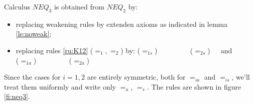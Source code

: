 \begin{DEFINITION} Calculus $NEQ_3$ is obtained from $NEQ_2$ by:
\begin{itemize}\MyLPar
\item replacing weakening rules by extenden axioms as indicated in lemma \ref{le:noweak};
\item replacing rules \ref{ru:K12} ($=_1, =_2$) by:
 ($=_{1s}$)
\label{ru:K12s} \ \ \ \ \ \ \ \ 
 ($=_{2s}$)\ \ \
and \\
\PROOFRULE{s=t,\Gamma_t^x,\Seq\Delta}{s=t,\Gamma_s^x,\Seq\Delta} ($=_{1a}$)
\label{ru:K12a} \ \ \ \ \ \ \ \ 
 ($=_{2a}$)\ \ \
%
\end{itemize}
\end{DEFINITION}
\noindent
Since the cases for $i=1,2$ are entirely symmetric, both for 
 $=_{ia}$ and $=_{is}$, we'll treat them uniformly and write only $=_a$,
 $=_s$.
The rules are shown in figure \ref{fi:neq3}.

